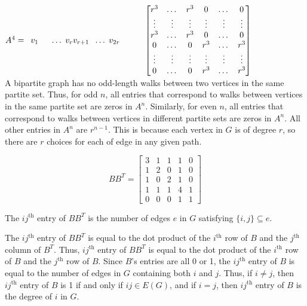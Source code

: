 \documentclass[12pt]{article}
\begin{document}
$A^4 = \,\,\,v_1\hspace*{5mm}\dots\hspace*{1mm} v_rv_{r+1}\hspace*{2mm}\dots\hspace*{1mm}v_{2r}\\
\hspace*{10mm}\begin{bmatrix}
r^3&\dots&r^3&0&\dots&0\\
\vdots&\vdots&\vdots&\vdots&\vdots&\vdots\\
r^3&\dots&r^3&0&\dots&0\\
0&\dots&0&r^3&\dots&r^3\\
\vdots&\vdots&\vdots&\vdots&\vdots&\vdots\\
0&\dots&0&r^3&\dots&r^3\\
\end{bmatrix}$\\

A bipartite graph has no odd-length walks between two vertices in the same partite set. Thus, for odd $n$, all entries that correspond to walks between vertices in the same partite set are zeros in $A^n$.
Similarly, for even $n$, all entries that correspond to walks between vertices in different partite sets are zeros in $A^n$.
All other entries in $A^n$ are $r^{n-1}$.
This is because each vertex in $G$ is of degree $r$, so there are $r$ choices for each of edge in any given path.
\newpage{}

$$BB^T = \begin{bmatrix}
3&1&1&1&0\\
1&2&0&1&0\\
1&0&2&1&0\\
1&1&1&4&1\\
0&0&0&1&1
\end{bmatrix}$$

 The $ij^{\text{th}}$ entry of $BB^T$ is the number of edges $e$ in $G$ satisfying $\{i,j\} \subseteq e$.

    The $ij^{\text{th}}$ entry of $BB^T$ is equal to the dot product of the $i^{\text{th}}$ row of $B$ and the $j^{\text{th}}$ column of $B^T$.
    Thus, $ij^{\text{th}}$ entry of $BB^T$ is equal to the dot product of the $i^{\text{th}}$ row of $B$ and the $j^{\text{th}}$ row of $B$.
    Since $B$'s entries are all 0 or 1, the $ij^{\text{th}}$ entry of $B$ is equal to the number of edges in $G$ containing both $i$ and $j$.
    Thus, if $i \neq j$, then $ij^{\text{th}}$ entry of $B$ is 1 if and only if $ij \in E(G)$, and if $i=j$, then $ij^{\text{th}}$ entry of $B$ is the degree of $i$ in $G$.
\end{document}
